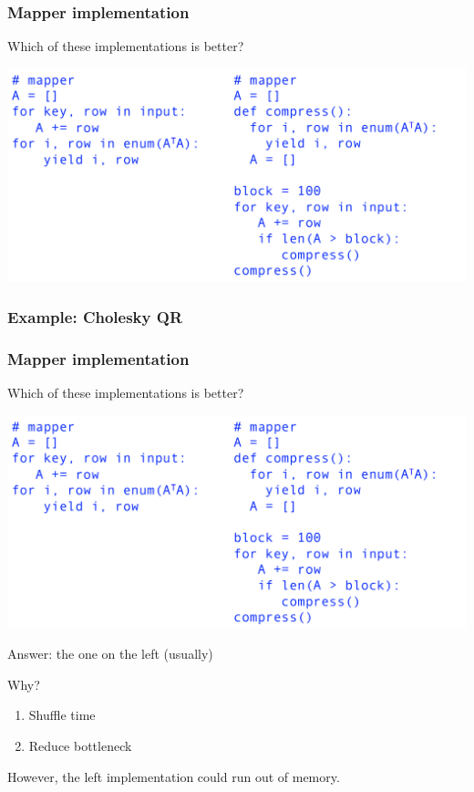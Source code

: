 \documentclass{beamer}
\begin{document}
\begin{frame}
\frametitle{Mapper implementation}

Which of these implementations is better?

\vspace{0.2in}
\includegraphics[height=2.in]{./images/chol_map1.png}

\end{frame}


\begin{frame}
\frametitle{Example: Cholesky QR}
\frametitle{Mapper implementation}

Which of these implementations is better?

\vspace{0.2in}
\includegraphics[height=2.in]{./images/chol_map1.png}
\vspace{0.2in}

Answer: the one on the left (usually)

\end{frame}

\begin{frame}

Why?

\vspace{0.4in}

\begin{enumerate}
\item{Shuffle time}
\item{Reduce bottleneck}
\end{enumerate}

\vspace{0.4in}

However, the left implementation could run out of memory.

\end{frame}
\end{document}

